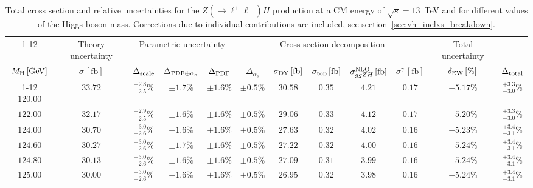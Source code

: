 \begin{landscape}
\begin{table}[ht!]
\caption{Total cross section and relative uncertainties for the $Z ( \rightarrow \ell^+ \ell^-) H$ production at a CM energy of  $\sqrt{s}=13$~TeV and for different values of the Higgs-boson mass. Corrections due to individual contributions are included, see section~\ref{sec:vh_inclxs_breakdown}.}
\label{tab:zh_lep_xs_13tev}
\centering
\scriptsize
{\renewcommand{\arraystretch}{1.4}
\begin{tabular}{| cc | c | ccc | ccccc | c |}
\cline{1-12}
\multicolumn{2}{|c|}{\(\sqrt{s} = 13\,\mathrm{TeV}\)} &
\multicolumn{1}{|c|}{Theory uncertainty} &
\multicolumn{3}{|c|}{Parametric uncertainty} &
\multicolumn{5}{|c|}{Cross-section decomposition} &
\multicolumn{1}{c|}{Total uncertainty} \\
\(M_\mathrm{H}\,[\mathrm{GeV}]\) & \(\sigma\,[\mathrm{fb}]\) &
\(\Delta_{\rm scale}\) &
\(\Delta_{\rm PDF\oplus\alpha_s}\) &
{\color{black!55}\(\Delta_{\rm PDF}\)} & {\color{black!55}\(\Delta_{\alpha_s}\)} &
\(\sigma_{\rm DY}\,[\mathrm{fb}]\) & \(\sigma_{\rm top}\,[\mathrm{fb}]\) & \(\sigma^{\rm NLO}_{ggZH}\,[\mathrm{fb}]\) & \(\sigma^\gamma\,[\mathrm{fb}]\) & \(\delta_{\rm EW}\,[\%]\) &
\(\Delta_{\rm total}\)
\\
\cline{1-12}
$120.00$ & $33.72$ & $^{+2.8}_{-2.5}\%$ & $\pm 1.7\%$ & {\color{black!55}$\pm 1.6\%$} & {\color{black!55}$\pm 0.5\%$} & $30.58$ & $0.35$ & $4.21$ & $0.17$ & $-5.17\%$ & $^{+3.3}_{-3.0}\%$ \\
$122.00$ & $32.17$ & $^{+2.9}_{-2.5}\%$ & $\pm 1.6\%$ & {\color{black!55}$\pm 1.6\%$} & {\color{black!55}$\pm 0.5\%$} & $29.06$ & $0.33$ & $4.12$ & $0.17$ & $-5.20\%$ & $^{+3.3}_{-3.0}\%$ \\
$124.00$ & $30.70$ & $^{+3.0}_{-2.6}\%$ & $\pm 1.6\%$ & {\color{black!55}$\pm 1.6\%$} & {\color{black!55}$\pm 0.5\%$} & $27.63$ & $0.32$ & $4.02$ & $0.16$ & $-5.23\%$ & $^{+3.4}_{-3.1}\%$ \\
$124.60$ & $30.27$ & $^{+3.0}_{-2.6}\%$ & $\pm 1.7\%$ & {\color{black!55}$\pm 1.6\%$} & {\color{black!55}$\pm 0.5\%$} & $27.22$ & $0.32$ & $4.00$ & $0.16$ & $-5.24\%$ & $^{+3.4}_{-3.1}\%$ \\
$124.80$ & $30.13$ & $^{+3.0}_{-2.6}\%$ & $\pm 1.6\%$ & {\color{black!55}$\pm 1.6\%$} & {\color{black!55}$\pm 0.5\%$} & $27.09$ & $0.31$ & $3.99$ & $0.16$ & $-5.24\%$ & $^{+3.4}_{-3.1}\%$ \\
$125.00$ & $30.00$ & $^{+3.0}_{-2.6}\%$ & $\pm 1.6\%$ & {\color{black!55}$\pm 1.6\%$} & {\color{black!55}$\pm 0.5\%$} & $26.95$ & $0.32$ & $3.98$ & $0.16$ & $-5.24\%$ & $^{+3.4}_{-3.1}\%$ \\

\end{tabular}}
\end{table}
\end{landscape}
